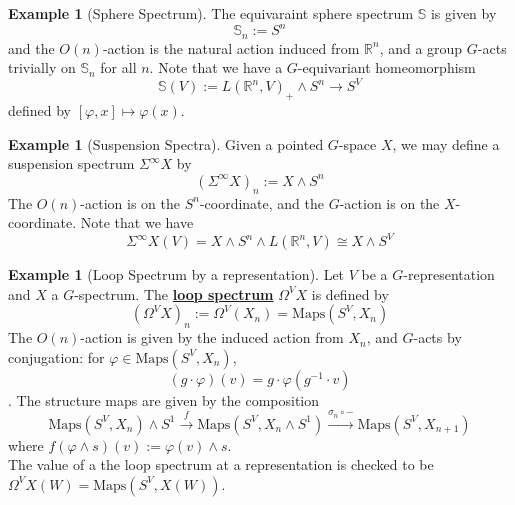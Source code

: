 \documentclass{article}
\theoremstyle{definition}
\newtheorem{example}[theorem]{Example}
\begin{document}
\begin{tcolorbox}[colback=yellow!5!white,colframe=yellow!30!white]
\begin{example}[Sphere Spectrum]
    The equivaraint sphere spectrum $\mathbb{S}$ is given by 
    \[\mathbb{S}_n:=S^n\]
    and the $O(n)$-action is the natural action induced from $\mathbb{R}^n$, and a group $G$-acts trivially on $\mathbb{S}_n$ for all $n$. Note that we have a $G$-equivariant homeomorphism 
    \[\mathbb{S}(V):=L(\mathbb{R}^n, V)_+\wedge S^n\to S^V\]
    defined by $[\varphi, x]\mapsto \varphi(x)$.
    
\end{example}
\end{tcolorbox}


\begin{tcolorbox}[colback=yellow!5!white,colframe=yellow!30!white]
\begin{example}[Suspension Spectra]
    Given a pointed $G$-space $X$, we may define a suspension spectrum $\Sigma^{\infty}X$ by 
    \[(\Sigma^{\infty}X)_n:=X\wedge S^n\]
    The $O(n)$-action is on the $S^n$-coordinate, and the $G$-action is on the $X$-coordinate. Note that we have 
    \[\Sigma^{\infty}X(V)=X\wedge S^n\wedge L(\mathbb{R}^n,V)\cong X\wedge S^V\]
\end{example}
\end{tcolorbox}


\begin{tcolorbox}[colback=yellow!5!white,colframe=yellow!30!white]
\begin{example}[Loop Spectrum by a representation]
    Let $V$ be a $G$-representation and $X$ a $G$-spectrum. The \underline{\textbf{loop spectrum}} $\Omega^VX$ is defined by 
    \[(\Omega^VX)_n:=\Omega^V(X_n)=\textrm{Maps}(S^V,X_n)\]
    The $O(n)$-action is given by the induced action from $X_n$, and $G$-acts by conjugation: for $\varphi\in \textrm{Maps}(S^V,X_n)$,
    \[(g\cdot \varphi)(v)=g\cdot \varphi(g^{-1}\cdot v)\]. The structure maps are given by the composition 
    \[\textrm{Maps}(S^V,X_n)\wedge S^1 \xrightarrow{f}\textrm{Maps}(S^V,X_n\wedge S^1)\xrightarrow{\sigma_n\circ -}\textrm{Maps}(S^V,X_{n+1})\]
    where $f(\varphi\wedge s)(v):=\varphi(v)\wedge s$.\\ 
    

    The value of a the loop spectrum at a representation is checked to be $\Omega^VX(W)=\textrm{Maps}(S^V, X(W))$.
\end{example}
\end{tcolorbox}
\end{document}
